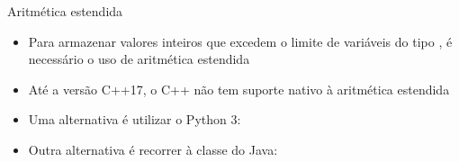 \begin{frame}[fragile]{Aritmética estendida}

    \begin{itemize}
        \item Para armazenar valores inteiros que excedem o limite de variáveis do tipo
            , é necessário o uso de aritmética estendida

        \item Até a versão C++17, o C++ não tem suporte nativo à aritmética estendida

        \item Uma alternativa é utilizar o Python 3:

        \item Outra alternativa é recorrer à classe  do Java:
    \end{itemize}

\end{frame}
